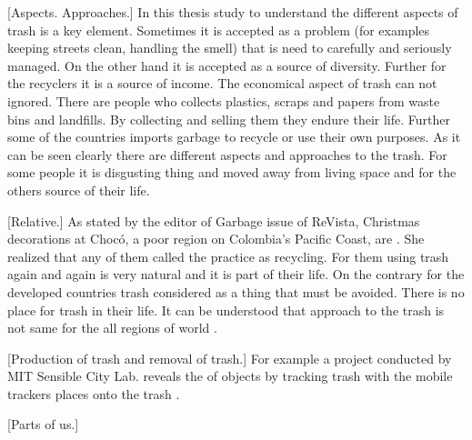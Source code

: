 %
%
[Aspects. Approaches.] In this thesis study to understand the different aspects of trash is a key element. Sometimes it is accepted as a problem (for examples keeping streets clean, handling the smell) that is need to carefully and seriously managed. On the other hand it is accepted as a source of diversity. Further for the recyclers it is a source of income. The economical aspect of trash can not ignored. There are people who collects plastics, scraps and papers from waste bins and landfills. By collecting and selling them they endure their life. Further some of the countries  imports garbage to recycle or use their own purposes. As it can be seen clearly there are different aspects and approaches to the trash. For some people it is disgusting thing and moved away from living space and for the others source of their life. 

[Relative.] As stated by the editor of Garbage issue of ReVista, Christmas decorations at Chocó, a poor region on Colombia’s Pacific Coast, are  \cite{erlick2015editorsletter}. She realized that any of them called the practice as recycling. For them using trash again and again is very natural and it is part of their life. On the contrary for the developed countries trash considered as a thing that must be avoided. There is no place for trash in their life. It can be understood that approach to the trash is not same for the all regions of world .


[Production of trash and removal of trash.] For example a project conducted by MIT Sensible City Lab. reveals the  of objects by tracking trash with the mobile trackers places onto the trash \cite{chen2009mit}.





%
%
[Parts of us.] 






